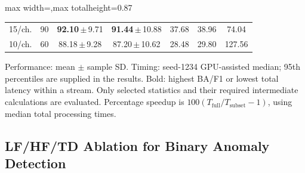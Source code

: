 \documentclass[letterpaper,journal]{IEEEtran}
\providecommand{\DIFaddbegin}{} %
\providecommand{\DIFaddend}{} %
\begin{document}
\begin{table}[p]
\begin{adjustbox}{max width=\textwidth,max totalheight=0.87\textheight}
\begin{minipage}{\textwidth}
\begin{minipage}[t]{0.48\textwidth}
\begin{tabular}{@{}lcccccc@{}}
15/ch. & 90 & \mbox{\textbf{92.10}\,$\pm$\,9.71} & \mbox{\textbf{91.44}\,$\pm$\,10.88} & 37.68 & 38.96 & 74.04 \\
10/ch. & 60 & \mbox{88.18\,$\pm$\,9.28} & \mbox{87.20\,$\pm$\,10.62} & 28.48 & 29.80 & 127.56 \\
\hline\end{tabular}
\par\smallskip\begin{minipage}{\columnwidth}\scriptsize Performance: mean $\pm$ sample SD. Timing: seed-1234 GPU-assisted median; 95th percentiles are supplied in the results. Bold: highest BA/F1 or lowest total latency within a stream. Only selected statistics and their required intermediate calculations are evaluated. Percentage speedup is $100(T_{\mathrm{full}}/T_{\mathrm{subset}}-1)$, using median total processing times.\end{minipage}

\end{minipage}
\end{minipage}
\end{adjustbox}
\end{table}




\DIFaddend \subsection{LF/HF/TD Ablation for Binary Anomaly Detection}
\label{sec:lfhf_ablation}
\DIFaddbegin
\end{document}
